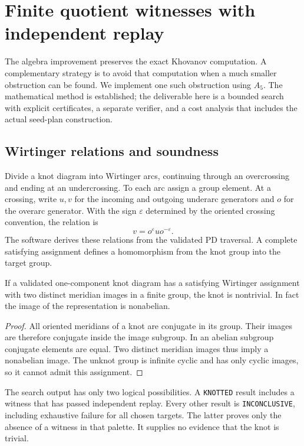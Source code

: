 \section{Finite quotient witnesses with independent replay}
\label{sec:quotients}

The algebra improvement preserves the exact Khovanov computation. A
complementary strategy is to avoid that computation when a much smaller
obstruction can be found. We implement one such obstruction using $A_5$.
The mathematical method is established; the deliverable here is a bounded
search with explicit certificates, a separate verifier, and a cost
analysis that includes the actual seed-plan construction.

\subsection{Wirtinger relations and soundness}

Divide a knot diagram into Wirtinger arcs, continuing through an
overcrossing and ending at an undercrossing. To each arc assign a group
element. At a crossing, write $u,v$ for the incoming and outgoing
underarc generators and $o$ for the overarc generator. With the sign
$\varepsilon$ determined by the oriented crossing convention, the
relation is
\begin{equation}
 v=o^{\varepsilon}u o^{-\varepsilon}.
 \label{eq:wirtinger}
\end{equation}
The software derives these relations from the validated PD traversal.
A complete satisfying assignment defines a homomorphism from the knot
group into the target group.

\begin{proposition}
\label{prop:obstruction}
If a validated one-component knot diagram has a satisfying Wirtinger
assignment with two distinct meridian images in a finite group, the knot
is nontrivial. In fact the image of the representation is nonabelian.
\end{proposition}
\begin{proof}
All oriented meridians of a knot are conjugate in its group. Their images
are therefore conjugate inside the image subgroup. In an abelian subgroup
conjugate elements are equal. Two distinct meridian images thus imply a
nonabelian image. The unknot group is infinite cyclic and has only cyclic
images, so it cannot admit this assignment.
\end{proof}

The search output has only two logical possibilities. A \texttt{KNOTTED}
result includes a witness that has passed independent replay. Every other
result is \texttt{INCONCLUSIVE}, including exhaustive failure for all
chosen targets. The latter proves only the absence of a witness in that
palette. It supplies no evidence that the knot is trivial.

